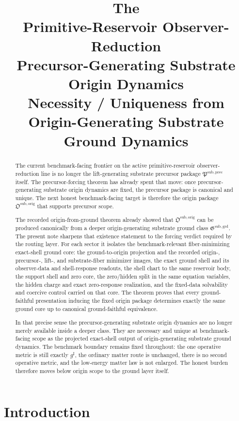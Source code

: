 \documentclass[11pt]{article}
\title{\textbf{The \TheoryName{}}\\[0.4em]
\large Primitive-Reservoir Observer-Reduction\\
\large Precursor-Generating Substrate Origin Dynamics\\
\large Necessity / Uniqueness from\\
\large Origin-Generating Substrate Ground Dynamics}
\author{}
\date{}
\newcommand{\CompletedMetric}{g^{\sharp}}
\newcommand{\OriginPackage}{\mathfrak O^{\mathrm{sub,orig}}}
\newcommand{\GroundPackage}{\mathfrak G^{\mathrm{sub,grd}}}
\newcommand{\PrecursorPackage}{\mathfrak P^{\mathrm{sub,prec}}}
\begin{document}
\maketitle

\begin{abstract}
The current benchmark-facing frontier on the active primitive-reservoir observer-reduction line is no longer the lift-generating substrate precursor package \(\PrecursorPackage\) itself. The precursor-forcing theorem has already spent that move: once precursor-generating substrate origin dynamics are fixed, the precursor package is canonical and unique. The next honest benchmark-facing target is therefore the origin package \(\OriginPackage\) that supports precursor scope.

The recorded origin-from-ground theorem already showed that \(\OriginPackage\) can be produced canonically from a deeper origin-generating substrate ground class \(\GroundPackage\). The present note sharpens that existence statement to the forcing verdict required by the routing layer. For each sector it isolates the benchmark-relevant fiber-minimizing exact-shell ground core: the ground-to-origin projection and the recorded origin-, precursor-, lift-, and substrate-fiber minimizer images, the exact ground shell and its observer-data and shell-response readouts, the shell chart to the same reservoir body, the support shell and zero core, the zero/hidden split in the same equation variables, the hidden charge and exact zero-response realization, and the fixed-data solvability and coercive control carried on that core. The theorem proves that every ground-faithful presentation inducing the fixed origin package determines exactly the same ground core up to canonical ground-faithful equivalence.

In that precise sense the precursor-generating substrate origin dynamics are no longer merely available inside a deeper class. They are necessary and unique at benchmark-facing scope as the projected exact-shell output of origin-generating substrate ground dynamics. The benchmark boundary remains fixed throughout: the one operative metric is still exactly \(\CompletedMetric\), the ordinary matter route is unchanged, there is no second operative metric, and the low-energy matter law is not enlarged. The honest burden therefore moves below origin scope to the ground layer itself.
\end{abstract}

\section{Introduction}
\end{document}
